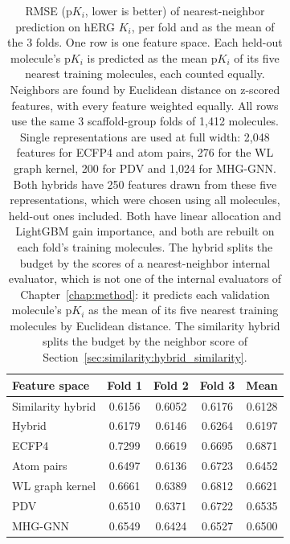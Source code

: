 \begin{table}[htbp]
\centering
\small
\begin{tabular}{@{}lcccc@{}}
\toprule
Feature space & Fold 1 & Fold 2 & Fold 3 & Mean \\
\midrule
Similarity hybrid & 0.6156 & 0.6052 & 0.6176 & 0.6128 \\
Hybrid & 0.6179 & 0.6146 & 0.6264 & 0.6197 \\
ECFP4 & 0.7299 & 0.6619 & 0.6695 & 0.6871 \\
Atom pairs & 0.6497 & 0.6136 & 0.6723 & 0.6452 \\
WL graph kernel & 0.6661 & 0.6389 & 0.6812 & 0.6621 \\
PDV & 0.6510 & 0.6371 & 0.6722 & 0.6535 \\
MHG-GNN & 0.6549 & 0.6424 & 0.6527 & 0.6500 \\
\bottomrule
\end{tabular}
\caption[Nearest-neighbor prediction on hERG $K_i$]{RMSE (p$K_i$, lower is better) of nearest-neighbor prediction on hERG $K_i$, per fold and as the mean of the 3 folds. One row is one feature space. Each held-out molecule's p$K_i$ is predicted as the mean p$K_i$ of its five nearest training molecules, each counted equally. Neighbors are found by Euclidean distance on z-scored features, with every feature weighted equally. All rows use the same 3 scaffold-group folds of 1,412 molecules. Single representations are used at full width: 2,048 features for ECFP4 and atom pairs, 276 for the WL graph kernel, 200 for PDV and 1,024 for MHG-GNN. Both hybrids have 250 features drawn from these five representations, which were chosen using all molecules, held-out ones included. Both have linear allocation and LightGBM gain importance, and both are rebuilt on each fold's training molecules. The hybrid splits the budget by the scores of a nearest-neighbor internal evaluator, which is not one of the internal evaluators of Chapter~\ref{chap:method}: it predicts each validation molecule's p$K_i$ as the mean of its five nearest training molecules by Euclidean distance. The similarity hybrid splits the budget by the neighbor score of Section~\ref{sec:similarity:hybrid_similarity}.}
\label{tab:ch6prelim_knn}
\end{table}

